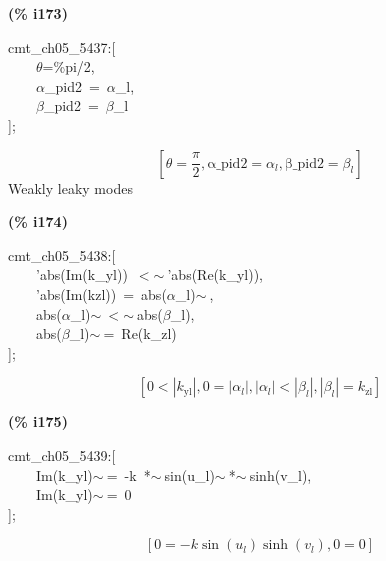 \documentclass[fleqn]{article}
\begin{document}
\noindent
\begin{minipage}[t]{4.000000em}\color{red}\bfseries
(\% i173)	
\end{minipage}
\begin{minipage}[t]{\textwidth}\color{blue}
cmt\_ch05\_5437:[\\
\ \ \ \ \ensuremath{\theta}=\%pi/2,\\
\ \ \ \ \ensuremath{\alpha}\_pid2\ =\ \ensuremath{\alpha}\_l,\\
\ \ \ \ \ensuremath{\beta}\_pid2\ =\ \ensuremath{\beta}\_l\\
];
\end{minipage}
\[\displaystyle \tag{\% o173} 
\left[ \theta =\frac{\ensuremath{\pi} }{2}\operatorname{,}\ensuremath{\mathrm{\alpha \_ pid2}}={{\alpha }_l}\operatorname{,}\ensuremath{\mathrm{\beta \_ pid2}}={{\beta }_l}\right] \mbox{}
\]
Weakly leaky modes


\noindent
\begin{minipage}[t]{4.000000em}\color{red}\bfseries
(\% i174)	
\end{minipage}
\begin{minipage}[t]{\textwidth}\color{blue}
cmt\_ch05\_5438:[\\
\ \ \ \ 'abs(Im(k\_yl))\ \ensuremath{<}\ensuremath{\sim\ }'abs(Re(k\_yl)),\\
\ \ \ \ 'abs(Im(kzl))\ =\ abs(\ensuremath{\alpha}\_l)\ensuremath{\sim\ },\ \\
\ \ \ \ abs(\ensuremath{\alpha}\_l)\ensuremath{\sim\ }\ensuremath{<}\ensuremath{\sim\ }abs(\ensuremath{\beta}\_l),\ \\
\ \ \ \ abs(\ensuremath{\beta}\_l)\ensuremath{\sim\ }=\ Re(k\_zl)\\
];
\end{minipage}
\[\displaystyle \tag{\% o174} 
\left[ 0\operatorname{<  }\left| {k_{\ensuremath{\mathrm{yl}}}}\right| \operatorname{,}0=\left| {{\alpha }_l}\right| \operatorname{,}\left| {{\alpha }_l}\right| \operatorname{<  }\left| {{\beta }_l}\right| \operatorname{,}\left| {{\beta }_l}\right| ={k_{\ensuremath{\mathrm{zl}}}}\right] \mbox{}
\]


\noindent
\begin{minipage}[t]{4.000000em}\color{red}\bfseries
(\% i175)	
\end{minipage}
\begin{minipage}[t]{\textwidth}\color{blue}
cmt\_ch05\_5439:[\\
\ \ \ \ Im(k\_yl)\ensuremath{\sim\ }=\ -k\ *\ensuremath{\sim\ }sin(u\_l)\ensuremath{\sim\ }*\ensuremath{\sim\ }sinh(v\_l),\\
\ \ \ \ Im(k\_yl)\ensuremath{\sim\ }=\ 0\\
];
\end{minipage}
\[\displaystyle \tag{\% o175} 
\left[ 0=-k \sin{\left( {u_l}\right) } \sinh{\left( {v_l}\right) }\operatorname{,}0=0\right] \mbox{}
\]
\end{document}
